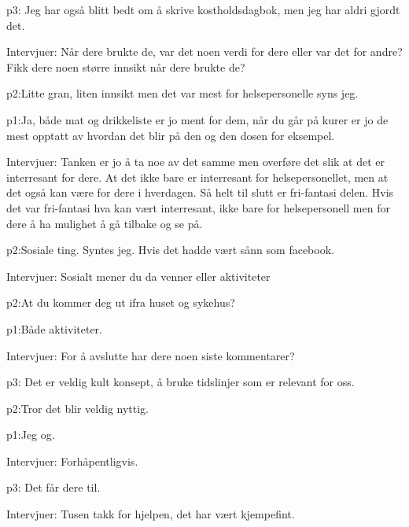 \documentclass[11pt,UKenglish, a4paper]{article}
\begin{document}
\textcolor{myR} {p3:} Jeg har også blitt bedt om å skrive kostholdsdagbok, men jeg har aldri gjordt det.

\textcolor{myBlue} {Intervjuer:} Når dere brukte de, var det noen verdi for dere eller var det for andre? Fikk dere noen større innsikt når dere brukte de?

\textcolor{myYellow} {p2:}Litte gran, liten innsikt men det var mest for helsepersonelle syns jeg.

\textcolor{myGreen} {p1:}Ja, både mat og drikkeliste er jo ment for dem, når du går på kurer er jo de mest opptatt av hvordan det blir på den og den dosen for eksempel.

\textcolor{myBlue} {Intervjuer:} Tanken er jo å ta noe av det samme men overføre det slik at det er interresant for dere. At det ikke bare er interresant for helsepersonellet, men at det også kan være for dere i hverdagen. Så helt til slutt er fri-fantasi delen. Hvis det var fri-fantasi hva kan vært interresant, ikke bare for helsepersonell men for dere å ha mulighet å gå tilbake og se på.

\textcolor{myYellow} {p2:}Sosiale ting. Syntes jeg. Hvis det hadde vært sånn som facebook.

\textcolor{myBlue} {Intervjuer:} Sosialt mener du da venner eller aktiviteter

\textcolor{myYellow} {p2:}At du kommer deg ut ifra huset og sykehus?

\textcolor{myGreen} {p1:}Både aktiviteter.

\textcolor{myBlue} {Intervjuer:} For å avslutte har dere noen siste kommentarer?

\textcolor{myR} {p3:} Det er veldig kult konsept, å bruke tidslinjer som er relevant for oss.

\textcolor{myYellow} {p2:}Tror det blir veldig nyttig.

\textcolor{myGreen} {p1:}Jeg og.

\textcolor{myBlue} {Intervjuer:} Forhåpentligvis.

\textcolor{myR} {p3:} Det får dere til.

\textcolor{myBlue} {Intervjuer:} Tusen takk for hjelpen, det har vært kjempefint.
\end{document}
